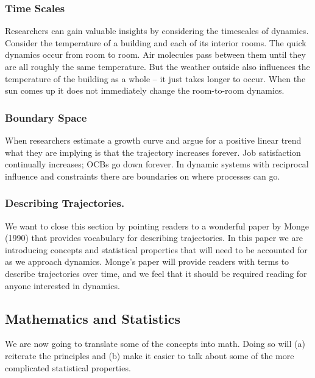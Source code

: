 \documentclass[english,,man]{apa6}
\theoremstyle{definition}
\theoremstyle{definition}
\theoremstyle{definition}
\theoremstyle{remark}
\begin{document}
\hypertarget{time-scales}{%
\subsubsection{Time Scales}\label{time-scales}}

Researchers can gain valuable insights by considering the timescales of
dynamics. Consider the temperature of a building and each of its
interior rooms. The quick dynamics occur from room to room. Air
molecules pass between them until they are all roughly the same
temperature. But the weather outside also influences the temperature of
the building as a whole -- it just takes longer to occur. When the sun
comes up it does not immediately change the room-to-room dynamics.

\hypertarget{boundary-space}{%
\subsubsection{Boundary Space}\label{boundary-space}}

When researchers estimate a growth curve and argue for a positive linear
trend what they are implying is that the trajectory increases forever.
Job satisfaction continually increases; OCBs go down forever. In dynamic
systems with reciprocal influence and constraints there are boundaries
on where processes can go.

\hypertarget{describing-trajectories.}{%
\subsubsection{Describing
Trajectories.}\label{describing-trajectories.}}

We want to close this section by pointing readers to a wonderful paper
by Monge (1990) that provides vocabulary for describing trajectories. In
this paper we are introducing concepts and statistical properties that
will need to be accounted for as we approach dynamics. Monge's paper
will provide readers with terms to describe trajectories over time, and
we feel that it should be required reading for anyone interested in
dynamics.

\hypertarget{mathematics-and-statistics}{%
\subsection{Mathematics and
Statistics}\label{mathematics-and-statistics}}

We are now going to translate some of the concepts into math. Doing so
will (a) reiterate the principles and (b) make it easier to talk about
some of the more complicated statistical properties.
\end{document}
